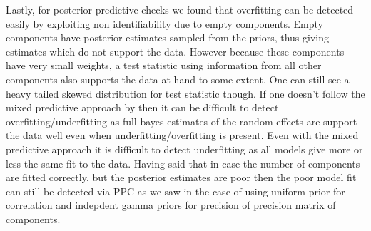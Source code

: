 Lastly, for posterior predictive checks we found that overfitting can be detected easily by exploiting non identifiability due to empty components. Empty components have posterior estimates sampled from the priors, thus giving estimates which do not support the data. However because these components have very small weights, a test statistic using information from all other components also supports the data at hand to some extent. One can still see a heavy tailed skewed distribution for test statistic though. If one doesn't follow the mixed predictive approach by \citet{marshall_approximate_2003} then it can be difficult to detect overfitting/underfitting as full bayes estimates of the random effects are support the data well even when underfitting/overfitting is present. Even with the mixed predictive approach it is difficult to detect underfitting as all models give more or less the same fit to the data. Having said that in case the number of components are fitted correctly, but the posterior estimates are poor then the poor model fit can still be detected via PPC as we saw in the case of using uniform prior for correlation and indepdent gamma priors for precision of precision matrix of components.